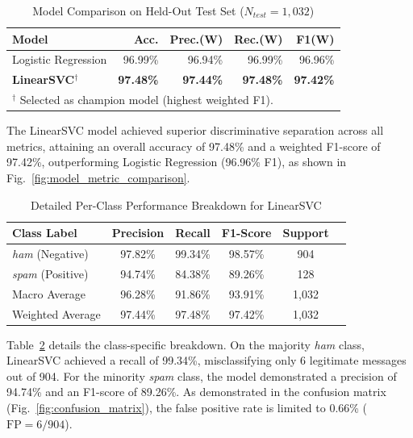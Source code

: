 \documentclass[conference]{IEEEtran}
\begin{document}
\begin{table}[htbp]
\caption{Model Comparison on Held-Out Test Set ($N_{test} = 1{,}032$)}
\label{tab:model_comparison}
\centering
\scriptsize
\setlength{\tabcolsep}{4pt}
\begin{tabular}{@{}lrrrr@{}}
\toprule
\textbf{Model} & \textbf{Acc.} & \textbf{Prec.(W)} & \textbf{Rec.(W)} & \textbf{F1(W)} \\
\midrule
Logistic Regression  & 96.99\% & 96.94\% & 96.99\% & 96.96\% \\
\textbf{LinearSVC}$^\dagger$ & \textbf{97.48\%} & \textbf{97.44\%} & \textbf{97.48\%} & \textbf{97.42\%} \\
\bottomrule
\multicolumn{5}{l}{$^\dagger$ Selected as champion model (highest weighted F1).}
\end{tabular}
\end{table}

The LinearSVC model achieved superior discriminative separation across all metrics, attaining an overall accuracy of 97.48\% and a weighted F1-score of 97.42\%, outperforming Logistic Regression (96.96\% F1), as shown in Fig.~\ref{fig:model_metric_comparison}.

\begin{table}[htbp]
\caption{Detailed Per-Class Performance Breakdown for LinearSVC}
\label{tab:per_class_metrics}
\centering
\small
\begin{tabularx}{\columnwidth}{@{}lccccX@{}}
\toprule
\textbf{Class Label} & \textbf{Precision} & \textbf{Recall} & \textbf{F1-Score} & \textbf{Support} \\
\midrule
\textit{ham} (Negative) & 97.82\% & 99.34\% & 98.57\% & 904 \\
\textit{spam} (Positive) & 94.74\% & 84.38\% & 89.26\% & 128 \\
\midrule
Macro Average & 96.28\% & 91.86\% & 93.91\% & 1,032 \\
Weighted Average & 97.44\% & 97.48\% & 97.42\% & 1,032 \\
\bottomrule
\end{tabularx}
\end{table}

Table~\ref{tab:per_class_metrics} details the class-specific breakdown. On the majority \textit{ham} class, LinearSVC achieved a recall of 99.34\%, misclassifying only 6 legitimate messages out of 904. For the minority \textit{spam} class, the model demonstrated a precision of 94.74\% and an F1-score of 89.26\%. As demonstrated in the confusion matrix (Fig.~\ref{fig:confusion_matrix}), the false positive rate is limited to 0.66\% ($\text{FP} = 6 / 904$).
\end{document}
